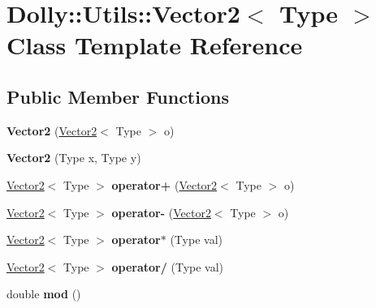 \hypertarget{class_dolly_1_1_utils_1_1_vector2}{}\section{Dolly\+:\+:Utils\+:\+:Vector2$<$ Type $>$ Class Template Reference}
\label{class_dolly_1_1_utils_1_1_vector2}
\subsection*{Public Member Functions}
\begin{DoxyCompactItemize}
\item 
\mbox{\label{class_dolly_1_1_utils_1_1_vector2_a291194875942ab9bf29c13ea117fff16}} 
{\bfseries Vector2} (\hyperlink{class_dolly_1_1_utils_1_1_vector2}{Vector2}$<$ Type $>$ o)
\item 
\mbox{\label{class_dolly_1_1_utils_1_1_vector2_afc21caca7d5e9646559a7f840cec9436}} 
{\bfseries Vector2} (Type x, Type y)
\item 
\mbox{\label{class_dolly_1_1_utils_1_1_vector2_a269d7a35db6022511d0f2f6b1d9d2b16}} 
\hyperlink{class_dolly_1_1_utils_1_1_vector2}{Vector2}$<$ Type $>$ {\bfseries operator+} (\hyperlink{class_dolly_1_1_utils_1_1_vector2}{Vector2}$<$ Type $>$ o)
\item 
\mbox{\label{class_dolly_1_1_utils_1_1_vector2_a8a97b51009c3b9e58bdb9203fbcef85a}} 
\hyperlink{class_dolly_1_1_utils_1_1_vector2}{Vector2}$<$ Type $>$ {\bfseries operator-\/} (\hyperlink{class_dolly_1_1_utils_1_1_vector2}{Vector2}$<$ Type $>$ o)
\item 
\mbox{\label{class_dolly_1_1_utils_1_1_vector2_a96132406cdf92add50d0ceb5dfcdd41c}} 
\hyperlink{class_dolly_1_1_utils_1_1_vector2}{Vector2}$<$ Type $>$ {\bfseries operator$\ast$} (Type val)
\item 
\mbox{\label{class_dolly_1_1_utils_1_1_vector2_a2110f14bf2e740a571cb03e0b5d5aa10}} 
\hyperlink{class_dolly_1_1_utils_1_1_vector2}{Vector2}$<$ Type $>$ {\bfseries operator/} (Type val)
\item 
\mbox{\label{class_dolly_1_1_utils_1_1_vector2_a7d965d9ae51c0a0207dae7d9dc8cad26}} 
double {\bfseries mod} ()
\end{DoxyCompactItemize}
